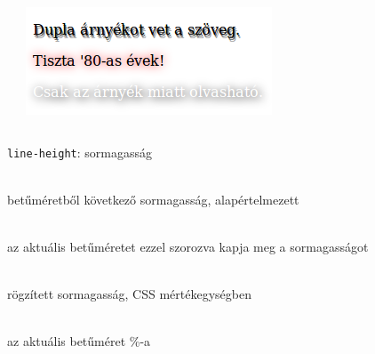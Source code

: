\begin{frame}
  \begin{columns}[c]
      \begin{exampleblock}{}
        \scriptsize
        
        
      \end{exampleblock}
      \includegraphics[width=\textwidth]{arnyek.png}
  \end{columns}
\end{frame}

\begin{frame}
  \texttt{line-height}: sormagasság
  \begin{description}[m]
    \item[\texttt{normal}] \hfill \\ betűméretből következő sormagasság, alapértelmezett
    \item[\emph{szám}] \hfill \\ az aktuális betűméretet ezzel szorozva kapja meg a sormagasságot
    \item[\emph{távolság}] \hfill \\ rögzített sormagasság, CSS mértékegységben
    \item[\texttt{\%}] \hfill \\ az aktuális betűméret \%-a
  \end{description}
\end{frame}

